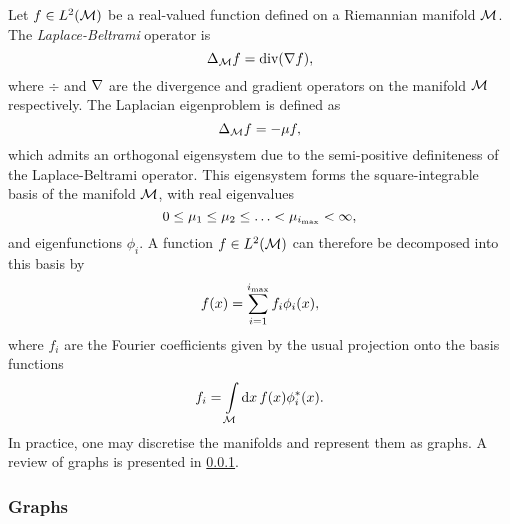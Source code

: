 Let \(f \in L^{2}(\mathcal{M})\) be a real-valued function defined on a Riemannian manifold \(\mathcal{M}{}\).
The \emph{Laplace-Beltrami} operator is
%
\begin{equation}
	\Delta_{\mathcal{M}} f
	= \text{div}(\nabla f),
\end{equation}
%
where \(\div{}\) and \(\nabla\) are the divergence and gradient operators on the manifold \(\mathcal{M}{}\) respectively.
The Laplacian eigenproblem is defined as
%
\begin{equation}
	\Delta_{\mathcal{M}} f
	= -\mu f,
\end{equation}
%
which admits an orthogonal eigensystem due to the semi-positive definiteness of the Laplace-Beltrami operator.
This eigensystem forms the square-integrable basis of the manifold \(\mathcal{M}{}\), with real eigenvalues
%
\begin{equation}
	0 \leq \mu_{1} \leq \mu_{2} \leq \ldots < \mu_{\imax} < \infty, %
\end{equation}
%
and eigenfunctions \(\phi_{i}\).
A function \(f \in L^{2}(\mathcal{M})\) can therefore be decomposed into this basis by
%
\begin{equation}
	f(x)
	= \sum\limits_{i=1}^{i_{\text{max}}} f_{i} \phi_{i}(x),
\end{equation}
%
where \(f_{i}\) are the Fourier coefficients given by the usual projection onto the basis functions
%
\begin{equation}
	f_{i}
	= \int\limits_{\mathcal{M}} \dd{x} f(x) \phi_{i}^{\ast}(x).
\end{equation}
%
In practice, one may discretise the manifolds and represent them as graphs.
A review of graphs is presented in \cref{sec:chapter5_graphs}.

\subsubsection{Graphs}\label{sec:chapter5_graphs}

